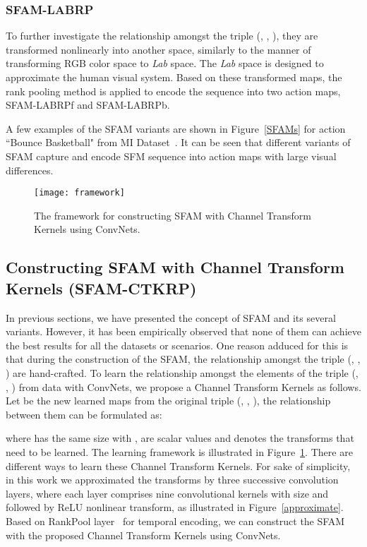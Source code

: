 \documentclass[10pt,twocolumn,letterpaper]{article}
\begin{document}
\subsubsection{SFAM-LABRP}

To further investigate the relationship amongst the triple (, 
,  ), they are transformed nonlinearly into another 
space, similarly to the manner of transforming RGB color space to \textit{Lab} 
space. The \textit{Lab} space is designed to approximate the human visual 
system.  Based on these transformed maps, the rank pooling method is applied to 
encode the sequence into two action maps, SFAM-LABRPf and SFAM-LABRPb. 

A few examples of the SFAM variants are shown in Figure~\ref{SFAMs} 
for action ``Bounce Basketball" from MI 
Dataset~\cite{liu2016benchmarking}. It can be seen that different variants of 
SFAM capture and encode SFM sequence into action maps with large visual 
differences.

\begin{figure}[t]
\begin{center}
{\texttt{[image: framework]}}
\end{center}
\caption{The framework for constructing SFAM with Channel Transform Kernels using ConvNets. }
\label{framework}
\end{figure}


\subsection{Constructing SFAM with Channel Transform Kernels (SFAM-CTKRP)}\label{sfam-learning}

In previous sections, we have presented the concept of SFAM and its several 
variants. 
However, it has been empirically observed that none of them can achieve the best 
results for all the datasets or scenarios. One reason adduced for this is 
that during the construction of the SFAM, the relationship amongst the triple 
(, , ) are hand-crafted.  To learn the 
relationship amongst the elements of the triple (, , 
) from data with ConvNets, we propose a Channel Transform Kernels 
as follows. 
Let  be the new learned maps from the original 
triple (, , ), the relationship between them 
can be formulated as:

where  has the same size with ,  are scalar values and  
denotes the transforms that need to be learned. The learning framework is 
illustrated in Figure~\ref{framework}. There are different ways to learn these 
Channel Transform Kernels. For sake of simplicity, in this work we approximated 
the transforms by three successive convolution layers, where each layer 
comprises nine convolutional kernels with size  and followed by 
ReLU nonlinear transform, as illustrated in Figure~\ref{approximate}. Based on 
RankPool layer~\cite{bilen2016dynamic} for temporal encoding, we can construct 
the SFAM with the proposed Channel Transform Kernels using ConvNets.
\end{document}
